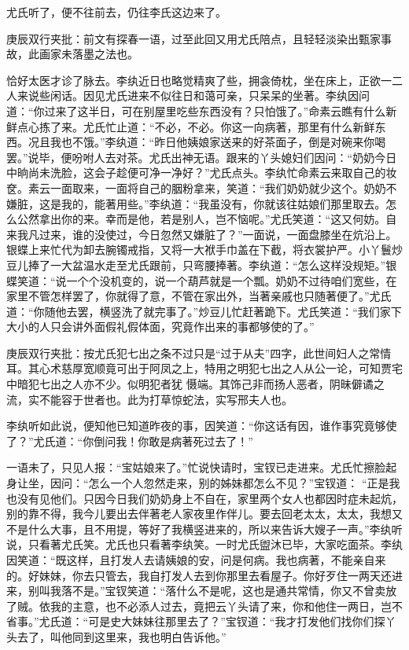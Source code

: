 \begin{parag}
    尤氏听了，便不往前去，仍往李氏这边来了。\begin{note}庚辰双行夹批：前文有探春一语，过至此回又用尤氏陪点，且轻轻淡染出甄家事故，此画家未落墨之法也。\end{note}恰好太医才诊了脉去。李纨近日也略觉精爽了些，拥衾倚枕，坐在床上，正欲一二人来说些闲话。因见尤氏进来不似往日和蔼可亲，只呆呆的坐著。李纨因问道：“你过来了这半日，可在别屋里吃些东西没有？只怕饿了。”命素云瞧有什么新鲜点心拣了来。尤氏忙止道：“不必，不必。你这一向病著，那里有什么新鲜东西。况且我也不饿。”李纨道：“昨日他姨娘家送来的好茶面子，倒是对碗来你喝罢。”说毕，便吩咐人去对茶。尤氏出神无语。跟来的丫头媳妇们因问：“奶奶今日中晌尚未洗脸，这会子趁便可净一净好？”尤氏点头。李纨忙命素云来取自己的妆奁。素云一面取来，一面将自己的胭粉拿来，笑道：“我们奶奶就少这个。奶奶不嫌脏，这是我的，能著用些。”李纨道：“我虽没有，你就该往姑娘们那里取去。怎么公然拿出你的来。幸而是他，若是别人，岂不恼呢。”尤氏笑道：“这又何妨。自来我凡过来，谁的没使过，今日忽然又嫌脏了？”一面说，一面盘膝坐在炕沿上。银蝶上来忙代为卸去腕镯戒指，又将一大袱手巾盖在下截，将衣裳护严。小丫鬟炒豆儿捧了一大盆温水走至尤氏跟前，只弯腰捧著。李纨道：“怎么这样没规矩。”银蝶笑道：“说一个个没机变的，说一个葫芦就是一个瓢。奶奶不过待咱们宽些，在家里不管怎样罢了，你就得了意，不管在家出外，当著亲戚也只随著便了。”尤氏道：“你随他去罢，横竖洗了就完事了。”炒豆儿忙赶著跪下。尤氏笑道：“我们家下大小的人只会讲外面假礼假体面，究竟作出来的事都够使的了。”\begin{note}庚辰双行夹批：按尤氏犯七出之条不过只是“过于从夫”四字，此世间妇人之常情耳。其心术慈厚宽顺竟可出于阿凤之上，特用之明犯七出之人从公一论，可知贾宅中暗犯七出之人亦不少。似明犯者犹 慑端。其饰己非而扬人恶者，阴昧僻谲之流，实不能容于世者也。此为打草惊蛇法，实写邢夫人也。\end{note}李纨听如此说，便知他已知道昨夜的事，因笑道：“你这话有因，谁作事究竟够使了？”尤氏道：“你倒问我！你敢是病著死过去了！”
\end{parag}


\begin{parag}
    一语未了，只见人报：“宝姑娘来了。”忙说快请时，宝钗已走进来。尤氏忙擦脸起身让坐，因问：“怎么一个人忽然走来，别的姊妹都怎么不见？”宝钗道： “正是我也没有见他们。只因今日我们奶奶身上不自在，家里两个女人也都因时症未起炕，别的靠不得，我今儿要出去伴著老人家夜里作伴儿。要去回老太太，太太，我想又不是什么大事，且不用提，等好了我横竖进来的，所以来告诉大嫂子一声。”李纨听说，只看著尤氏笑。尤氏也只看著李纨笑。一时尤氏盥沐已毕，大家吃面茶。李纨因笑道：“既这样，且打发人去请姨娘的安，问是何病。我也病著，不能亲自来的。好妹妹，你去只管去，我自打发人去到你那里去看屋子。你好歹住一两天还进来，别叫我落不是。”宝钗笑道：“落什么不是呢，这也是通共常情，你又不曾卖放了贼。依我的主意，也不必添人过去，竟把云丫头请了来，你和他住一两日，岂不省事。”尤氏道：“可是史大妹妹往那里去了？”宝钗道：“我才打发他们找你们探丫头去了，叫他同到这里来，我也明白告诉他。”
\end{parag}


